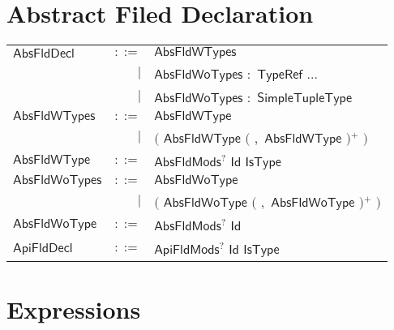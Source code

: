 \section{Abstract Filed Declaration} 

 
\begin{longtable}[l]{p{3cm}rl}
$\mathsf{AbsFldDecl}$ &  $\mathsf{::=}$  & $\mathsf{AbsFldWTypes}$ \\
 & $\big|$ &  $\mathsf{AbsFldWoTypes}$ $\mathbf{:}$ $\mathsf{TypeRef}$ $\mathbf{...}$ \\
 & $\big|$ &  $\mathsf{AbsFldWoTypes}$ $\mathbf{:}$ $\mathsf{SimpleTupleType}$ \\
$\mathsf{AbsFldWTypes}$ &  $\mathsf{::=}$  & $\mathsf{AbsFldWType}$ \\
 & $\big|$ &  $\big($  $\mathsf{AbsFldWType}$ $\big($  $\mathbf{,}$ $\mathsf{AbsFldWType}$ $\big)$$^+$ $\big)$ \\
$\mathsf{AbsFldWType}$ &  $\mathsf{::=}$  & $\mathsf{AbsFldMods}$$^?$ $\mathsf{Id}$ $\mathsf{IsType}$ \\
$\mathsf{AbsFldWoTypes}$ &  $\mathsf{::=}$  & $\mathsf{AbsFldWoType}$ \\
 & $\big|$ &  $\big($  $\mathsf{AbsFldWoType}$ $\big($  $\mathbf{,}$ $\mathsf{AbsFldWoType}$ $\big)$$^+$ $\big)$ \\
$\mathsf{AbsFldWoType}$ &  $\mathsf{::=}$  & $\mathsf{AbsFldMods}$$^?$ $\mathsf{Id}$ \\
$\mathsf{ApiFldDecl}$ &  $\mathsf{::=}$  & $\mathsf{ApiFldMods}$$^?$ $\mathsf{Id}$ $\mathsf{IsType}$ \\
\end{longtable} \hfill 

\section{Expressions} 

